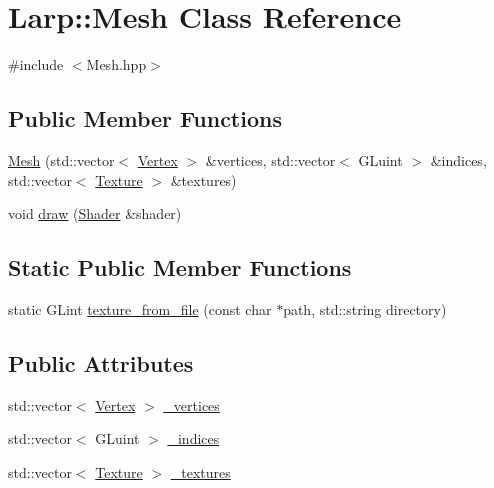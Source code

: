 \hypertarget{classLarp_1_1Mesh}{}\section{Larp\+:\+:Mesh Class Reference}
\label{classLarp_1_1Mesh}


{\ttfamily \#include $<$Mesh.\+hpp$>$}

\subsection*{Public Member Functions}
\begin{DoxyCompactItemize}
\item 
\hyperlink{classLarp_1_1Mesh_ab7f7199729635bc93d6f8994d8365527}{Mesh} (std\+::vector$<$ \hyperlink{structLarp_1_1Vertex}{Vertex} $>$ \&vertices, std\+::vector$<$ G\+Luint $>$ \&indices, std\+::vector$<$ \hyperlink{classLarp_1_1Texture}{Texture} $>$ \&textures)
\item 
void \hyperlink{classLarp_1_1Mesh_a513ccafd9d38ec3300f4b872fc73c6e0}{draw} (\hyperlink{classLarp_1_1Shader}{Shader} \&shader)
\end{DoxyCompactItemize}
\subsection*{Static Public Member Functions}
\begin{DoxyCompactItemize}
\item 
static G\+Lint \hyperlink{classLarp_1_1Mesh_a5841a3876b33f0f273287afc5ac631f2}{texture\+\_\+from\+\_\+file} (const char $\ast$path, std\+::string directory)
\end{DoxyCompactItemize}
\subsection*{Public Attributes}
\begin{DoxyCompactItemize}
\item 
std\+::vector$<$ \hyperlink{structLarp_1_1Vertex}{Vertex} $>$ \hyperlink{classLarp_1_1Mesh_af77086ebadfb8b0f4fb3c2e5f39d6a43}{\+\_\+vertices}
\item 
std\+::vector$<$ G\+Luint $>$ \hyperlink{classLarp_1_1Mesh_af2ef7e4f28a5454c159d1f2684008926}{\+\_\+indices}
\item 
std\+::vector$<$ \hyperlink{classLarp_1_1Texture}{Texture} $>$ \hyperlink{classLarp_1_1Mesh_a54c9edf45e99fb0261a39bfc3e8ff091}{\+\_\+textures}
\end{DoxyCompactItemize}
